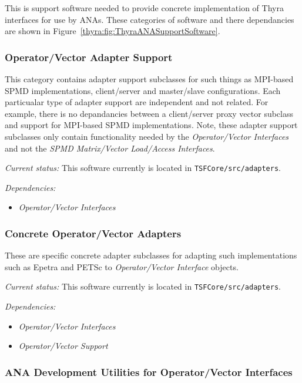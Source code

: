 \documentclass[pdf,ps2pdf,11pt]{SANDreport}
\begin{document}
This is support software needed to provide concrete implementation of Thyra
interfaces for use by ANAs.  These categories of software and there
dependancies are shown in Figure~\ref{thyra:fig:ThyraANASupportSoftware}.

%
\subsubsection{Operator/Vector Adapter Support}
%

This category contains adapter support subclasses for such things as MPI-based
SPMD implementations, client/server and master/slave configurations.  Each
particualar type of adapter support are independent and not related.  For
example, there is no depandancies between a client/server proxy vector
subclass and support for MPI-based SPMD implementations.  Note, these adapter
support subclasses only contain functionality needed by the
{}\textit{Operator/Vector Interfaces} and not the {}\textit{SPMD Matrix/Vector
Load/Access Interfaces}.

{}\textit{Current status:} This software currently is located in
{}\texttt{TSFCore/src/adapters}.

{}\textit{Dependencies:}
\begin{itemize}
\item {}\textit{Operator/Vector Interfaces}
\end{itemize}

%
\subsubsection{Concrete Operator/Vector Adapters}
%

These are specific concrete adapter subclasses for adapting such
implementations such as Epetra and PETSc to {}\textit{Operator/Vector
Interface} objects.

{}\textit{Current status:} This software currently is located in
{}\texttt{TSFCore/src/adapters}.

{}\textit{Dependencies:}
\begin{itemize}
\item {}\textit{Operator/Vector Interfaces}
\item {}\textit{Operator/Vector Support}
\end{itemize}

%
\subsubsection{ANA Development Utilities for Operator/Vector Interfaces}
%
\end{document}
